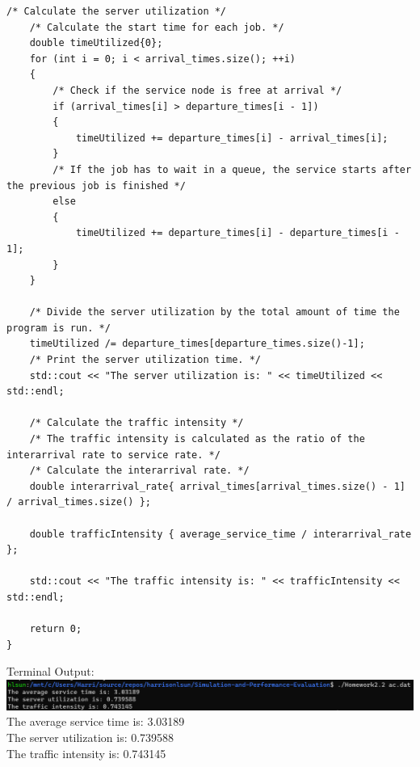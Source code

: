 \begin{lstlisting}[style=CStyle]
    /* Calculate the server utilization */
    /* Calculate the start time for each job. */
    double timeUtilized{0};
    for (int i = 0; i < arrival_times.size(); ++i)
    {
		/* Check if the service node is free at arrival */
		if (arrival_times[i] > departure_times[i - 1])
		{
			timeUtilized += departure_times[i] - arrival_times[i];
		}
		/* If the job has to wait in a queue, the service starts after the previous job is finished */
		else
		{
			timeUtilized += departure_times[i] - departure_times[i - 1];
		}
    }
    
    /* Divide the server utilization by the total amount of time the program is run. */
    timeUtilized /= departure_times[departure_times.size()-1];
    /* Print the server utilization time. */
    std::cout << "The server utilization is: " << timeUtilized << std::endl;
	
	/* Calculate the traffic intensity */
	/* The traffic intensity is calculated as the ratio of the interarrival rate to service rate. */
	/* Calculate the interarrival rate. */
    double interarrival_rate{ arrival_times[arrival_times.size() - 1] / arrival_times.size() };

    double trafficIntensity { average_service_time / interarrival_rate };

    std::cout << "The traffic intensity is: " << trafficIntensity << std::endl;
	
    return 0;
}
\end{lstlisting}
\newpage
\noindent Terminal Output:\\
\includegraphics[scale=0.5]{Sections/H2_2.png}\\
The average service time is: 3.03189\\
The server utilization is: 0.739588\\
The traffic intensity is: 0.743145\\\\
